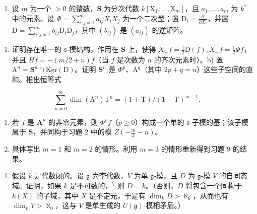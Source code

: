 \begin{enumerate}
\def\labelenumi{\arabic{enumi})}
\setcounter{enumi}{9}
\tightlist
\item
  设 \(m\) 为一个 \(> 0\) 的整数，\(\mathbf{S}\) 为分次代数 \(k[\mathrm{X}_1, \ldots, \mathrm{X}_m]\)，且 \(a_1, \ldots, a_m\) 为 \(k^*\) 中的元素。设 \(\Phi = \sum_{i,j=1}^{m} a_{ij} X_i X_j\) 为一个二次型；置 \(\mathrm{D}_i = \frac{\partial}{\partial X_i}\)，并置 \(\mathrm{D} = \sum_{i,j=1}^{m} b_{ij} \mathrm{D}_i \mathrm{D}_j\)，其中 \((b_{ij})\) 是 \((a_{ij})\) 的逆矩阵。
\end{enumerate}

\begin{enumerate}
\def\labelenumi{\alph{enumi})}
\tightlist
\item
  证明存在唯一的 \(\mathfrak{s}\)-模结构，作用在 \(\mathbf{S}\) 上，使得 \(X_{+}f = \frac{1}{2}\mathrm{D}(f), X_{-}f = \frac{1}{2}\Phi f\)，并且 \(Hf = -(m / 2 + n)f\)（当 \(f\) 是次数为 \(n\) 的齐次元素时）。b) 置 \(\mathrm{A}^n = \mathbf{S}^n \cap \mathrm{Ker}(\mathrm{D})\)。证明 \(\mathbf{S}^n\) 是 \(\Phi^p\)、\(\mathrm{A}^q\)（其中 \(2p + q = n\)）这些子空间的直和。推出恒等式
\end{enumerate}

\[
\sum_ {n = 0} ^ {\infty} \dim (\mathrm{A} ^ {n}) \mathrm{T} ^ {n} = (1 + \mathrm{T}) / (1 - \mathrm{T}) ^ {m - 1}.
\]

\begin{enumerate}
\def\labelenumi{\alph{enumi})}
\setcounter{enumi}{2}
\item
  若 \(f\) 是 \(\mathbf{A}^n\) 的非零元素，则 \(\varPhi^p f\)（\(p \geq 0\)）构成一个单的 \(\mathfrak{s}\)-子模的基；该子模属于 \(\mathbf{S}\)，并同构于习题 2 中的模 \(Z\left(-\frac{m}{2} - n\right)\)。
\item
  具体写出 \(m = 1\) 和 \(m = 2\) 的情形。利用 \(m = 3\) 的情形重新得到习题 9 的结果。
\end{enumerate}

\begin{enumerate}
\def\labelenumi{\arabic{enumi})}
\setcounter{enumi}{10}
\tightlist
\item
  假设 \(k\) 是代数闭的。设 \(\mathfrak{g}\) 为李代数，\(V\) 为单 \(\mathfrak{g}\)-模，且 \(D\) 为 \(\mathfrak{g}\)-模 \(V\) 的自同态域。证明，如果 \(k\) 是不可数的，\(^7\) 则 \(D = k\)。（否则，\(D\) 将包含一个同构于 \(k(X)\) 的子域，其中 \(X\) 是不定元，于是有 \(\dim_k D > \aleph_0\)，从而也有 \(\dim_k V > \aleph_0\)，这与 \(V\) 是单生成的 \(U(\mathfrak{g})\)-模相矛盾。）
\end{enumerate}

